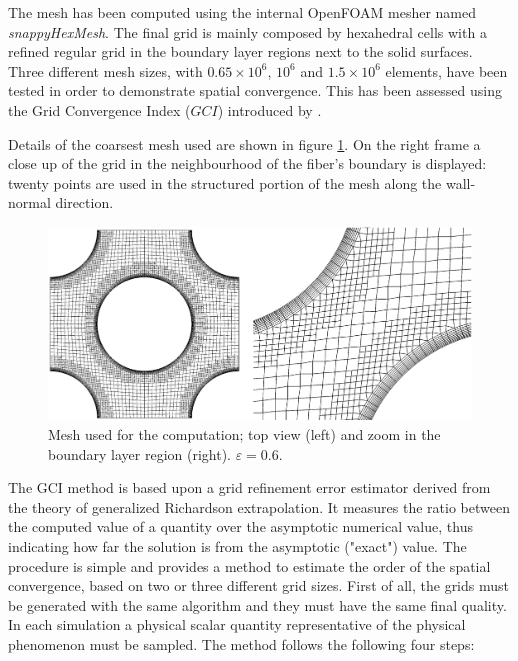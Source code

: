 

The mesh has been computed using  the internal OpenFOAM mesher named \textit{snappyHexMesh}.
The final grid is mainly composed by hexahedral cells with a refined regular grid in the boundary layer regions next to the solid surfaces.
Three different mesh sizes, with $0.65 \times 10^6$, $10^6$ and $1.5 \times 10^6$ elements, have been tested in order to demonstrate spatial convergence. This has been assessed using the Grid Convergence Index ($GCI$) introduced by \citet{roache}.

Details of the coarsest mesh used are shown in figure \ref{fig:mesh1}. On the  right frame a close up of the grid in the neighbourhood of the fiber's boundary is displayed: twenty points are used in the structured portion of the mesh along the wall-normal direction.

\begin{figure}[h]
	\centering
	\includegraphics[width=0.8\linewidth]{chapter_4/figure/mesh}
	\caption{Mesh used for the computation; top view (left) and zoom in the boundary layer region (right). $\varepsilon = 0.6$.}
	\label{fig:mesh1}
\end{figure}

The GCI method is based upon a grid refinement error estimator derived from the
theory of generalized Richardson extrapolation. It measures the ratio between the computed value of a quantity over the asymptotic numerical value, thus indicating how far the solution is from the asymptotic ("exact") value.
The procedure is simple and provides a method to estimate the order of the spatial
convergence, based on two or three different grid sizes.
First of all, the grids must be generated with the same algorithm and they must  have the same final quality.
In each simulation  a physical scalar quantity representative of the physical phenomenon must be sampled.
The method follows the following four steps:

